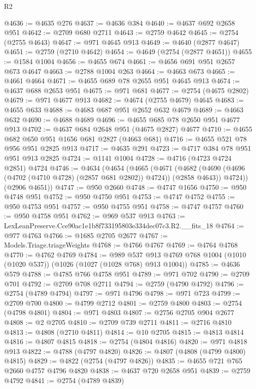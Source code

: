 \begin{lexlean}{R2}
\begin{coremodule}
@4636 := @4635 @276
@4637 := @4636 @384
@4640 := @4637 @692 @2658 @951
@4642 := @2709 @680 @2711
@4643 := @2759 @4642
@4645 := @2754 (@2755 @4643)
@4647 := @971 @4645 @913
@4649 := @4640 (@2877 @4647)
@4651 := @2759 (@2710 @4642)
@4654 := @4649 (@2754 (@2877 @4651))
@4655 := @1584 @1004
@4656 := @4655 @674
@4661 := @4656 @691 @951 @2657 @673 @4647
@4663 := @2788 @1004 @263
@4664 := @4663 @673
@4665 := @4661 @4664
@4671 := @4655 @689 @78 @2655 @951 @4645 @913
@4674 := @4637 @688 @2653 @951
@4675 := @971 @681
@4677 := @2754 (@4675 @2802)
@4679 := @971 @4677 @913
@4682 := @4674 (@2755 @4679) @4645
@4683 := @4655 @633
@4688 := @4683 @687 @951 @2652 @632 @4679
@4689 := @4663 @632
@4690 := @4688 @4689
@4696 := @4655 @685 @78 @2650 @951 @4677 @913
@4702 := @4637 @684 @2648 @951 (@4675 @2827) @4677
@4710 := @4655 @682 @650 @951 @1656 @681 @2827 (@4663 @681)
@4716 := @4655 @521 @78 @956 @951 @2825 @913
@4717 := @4635 @291
@4723 := @4717 @384 @78 @951 @951 @913 @2825
@4724 := @1141 @1004
@4728 := @4716 (@4723 @4724 @2851) @4724
@4746 := @4634
    (@4654
      (@4665
        (@4671
          (@4682 (@4690 (@4696 (@4702 (@4710 @4728) (@2857 @681 @2802)) @4724)) (@2858 @4643))
          @4724))
      (@2906 @4651))
@4747 := @950 @2660
@4748 := @4747 @1656
@4750 := @950 @4748 @951
@4752 := @950 @4750 @951
@4753 := @4747 @4752
@4755 := @950 @4753 @951
@4757 := @950 @4755 @951
@4758 := @4747 @4757
@4760 := @950 @4758 @951
@4762 := @969 @537 @913
@4763 := LexLeanPreserve.Cce90ac1e1b8f733195803e334dec07c3.R2.__fits_18
@4764 := @977 @4763
@4766 := @1685 @2705 @2677
@4767 := Models.Triage.triageWeights
@4768 := @4766 @4767
@4769 := @4764 @4768
@4770 := @4762 @4769
@4784 := @989
    @537
    @913
    @4769
    @768
    @1004
    (@1010 (@1020 @537))
    (@1026 (@1027 (@1028 @768) @913 @1004))
@4785 := @4636 @579
@4788 := @4785 @766 @4758 @951
@4789 := @971 @702
@4790 := @2709 @701
@4792 := @2709 @708 @2711
@4794 := @2759 (@4790 @4792)
@4796 := @2754 (@4789 @4794)
@4797 := @971 @4796
@4798 := @971 @723
@4799 := @2709 @700
@4800 := @4799 @2712
@4801 := @2759 @4800
@4803 := @2754 (@4798 @4801)
@4804 := @971 @4803
@4807 := @2756 @2705 @904 @2677
@4808 := @2 @2705
@4810 := @2709 @739 @2711
@4811 := @2716 @4810
@4813 := @4808 (@2710 @4811)
@4814 := @10 @2705
@4815 := @4813 @4814
@4816 := @4807 @4815
@4818 := @2754 (@4804 @4816)
@4820 := @971 @4818 @913
@4822 := @4788 (@4797 @4820)
@4826 := @4807 (@4808 (@4799 @4800) @4815)
@4829 := @4822 (@2754 (@4797 @4826))
@4835 := @4655 @721 @765 @2660 @4757 @4796 @4820
@4838 := @4637 @720 @2658 @951
@4839 := @2759 @4792
@4841 := @2754 (@4789 @4839)

\end{coremodule}
\end{lexlean}
